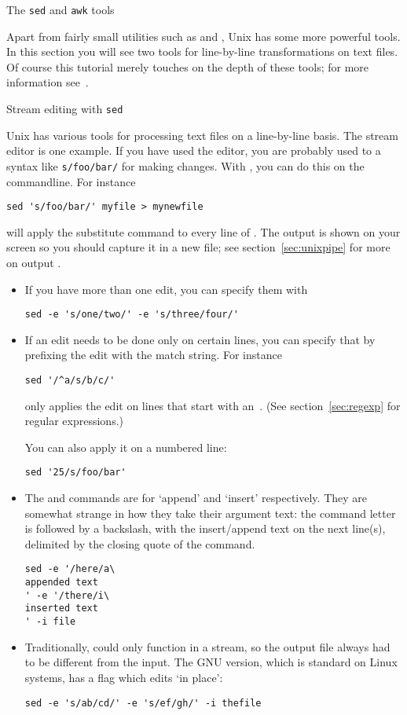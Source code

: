  {The {\tt sed} and {\tt awk} tools}

Apart from fairly small utilities such as  and , Unix
has some more powerful tools. In this section you will see two tools for
line-by-line transformations on text files. Of course this tutorial
merely touches on the depth of these tools; for more information
see~\cite{AWK:awk,OReilly:sedawk}.

 {Stream editing with \protect\texttt{sed}}

Unix has various tools for processing text files on a line-by-line
basis.
The stream editor  is one example. If you have used the
 editor, you are probably used to a syntax like
\verb+s/foo/bar/+ for making changes.
With , you can do this on the commandline.
For instance
\begin{lstlisting}
sed 's/foo/bar/' myfile > mynewfile
\end{lstlisting}
will apply the substitute command  to every line of
. The output is shown on your screen so you should capture
it in a new file; see section~\ref{sec:unixpipe} for more on output
.

\begin{itemize}
\item If you have more than one edit, you can specify them with
\begin{lstlisting}
sed -e 's/one/two/' -e 's/three/four/'
\end{lstlisting}
\item If an edit needs to be done only on certain lines, you can
  specify that by prefixing the edit with the match string. For instance
\begin{lstlisting}
sed '/^a/s/b/c/'
\end{lstlisting}
only applies the edit on lines that start with an~. (See
section~\ref{sec:regexp} for regular expressions.)

You can also apply it on a numbered line:
\begin{lstlisting}
sed '25/s/foo/bar'
\end{lstlisting}
\item The  and  commands are for `append' and `insert' respectively.
  They are somewhat strange in how they take their argument text:
  the command letter is followed by a backslash, with the insert/append
  text on the next line(s), delimited by the closing quote of the command.
\begin{lstlisting}
sed -e '/here/a\
appended text
' -e '/there/i\
inserted text
' -i file
\end{lstlisting}
\item Traditionally,  could only function in a stream, so
  the output file always had to be different from the input. The GNU
  version, which is standard on Linux systems, has a flag \n{-i} which
  edits `in place':
\begin{lstlisting}
sed -e 's/ab/cd/' -e 's/ef/gh/' -i thefile
\end{lstlisting}
\end{itemize}

